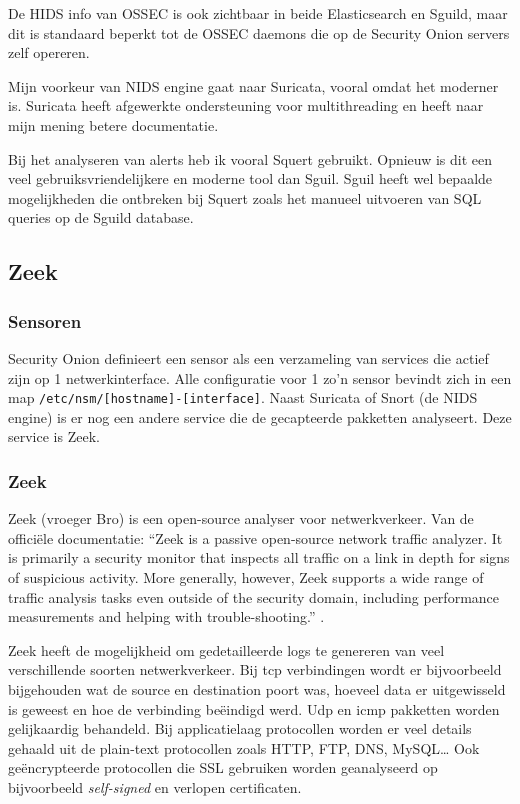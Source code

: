 \documentclass[a4paper,12pt]{report}
\begin{document}
De HIDS info van OSSEC is ook zichtbaar in beide Elasticsearch en Sguild, maar dit is standaard beperkt tot de OSSEC daemons die op de Security Onion servers zelf opereren.

Mijn voorkeur van NIDS engine gaat naar Suricata, vooral omdat het moderner is.
Suricata heeft afgewerkte ondersteuning voor multithreading en heeft naar mijn mening betere documentatie.

Bij het analyseren van alerts heb ik vooral Squert gebruikt.
Opnieuw is dit een veel gebruiksvriendelijkere en moderne tool dan Sguil.
Sguil heeft wel bepaalde mogelijkheden die ontbreken bij Squert zoals het manueel uitvoeren van SQL queries op de Sguild database.

\subsection{Zeek}
\subsubsection{Sensoren}
Security Onion definieert een sensor als een verzameling van services die actief zijn op 1 netwerkinterface.
Alle configuratie voor 1 zo'n sensor bevindt zich in een map \lstinline|/etc/nsm/[hostname]-[interface]|.
Naast Suricata of Snort (de NIDS engine) is er nog een andere service die de gecapteerde pakketten analyseert.
Deze service is Zeek.

\subsubsection{Zeek}
Zeek (vroeger Bro) is een open-source analyser voor netwerkverkeer.
Van de officiële documentatie:
``Zeek is a passive open-source network traffic analyzer.
It is primarily a security monitor that inspects all traffic on a link in depth for signs of suspicious activity.
More generally, however, Zeek supports a wide range of traffic analysis tasks even outside of the security domain, including performance measurements and helping with trouble-shooting.'' \autocite{zeek:docs}.

Zeek heeft de mogelijkheid om gedetailleerde logs te genereren van veel verschillende soorten netwerkverkeer.
Bij tcp verbindingen wordt er bijvoorbeeld bijgehouden wat de source en destination poort was, hoeveel data er uitgewisseld is geweest en hoe de verbinding beëindigd werd.
Udp en icmp pakketten worden gelijkaardig behandeld.
Bij applicatielaag protocollen worden er veel details gehaald uit de plain-text protocollen zoals HTTP, FTP, DNS, MySQL\dots
Ook geëncrypteerde protocollen die SSL gebruiken worden geanalyseerd op bijvoorbeeld \emph{self-signed} en verlopen certificaten.
\end{document}
